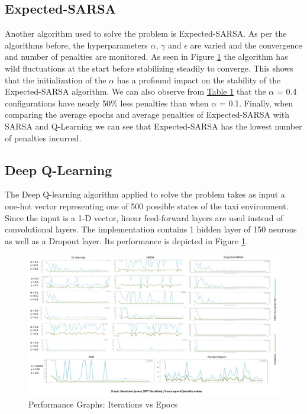 \documentclass{svproc}
\begin{document}
\subsection{Expected-SARSA}
Another algorithm used to solve the problem is Expected-SARSA. As per the algorithms before, the hyperparameters $\alpha$, $\gamma$ and $\epsilon$ are varied and the convergence and number of penalties are monitored. As seen in Figure \ref{fig:comparativeplot} the algorithm has wild fluctuations at the start before stabilizing steadily to converge. This shows that the initialization of the $\alpha$ has a profound impact on the stability of the Expected-SARSA algorithm. We can also observe from \hyperref[tab:table]{Table 1} that the $\alpha$ = 0.4 configurations have nearly 50\% less penalties than when $\alpha$ = 0.1. Finally, when comparing the average epochs and average penalties of Expected-SARSA with SARSA and Q-Learning we can see that Expected-SARSA has the lowest number of penalties incurred. 

\subsection{Deep Q-Learning}
The Deep Q-learning algorithm applied to solve the problem takes as input a one-hot vector representing one of 500 possible states of the taxi environment. Since the input is a 1-D vector, linear feed-forward layers are used instead of convolutional layers. The implementation contains 1 hidden layer of 150 neurons as well as a Dropout layer. Its performance is depicted in Figure \ref{fig:comparativeplot}.
\begin{figure}[]
\centering
\includegraphics[scale = 0.4]{figures/comparativeplotFinal.jpg}
\caption{Performance Graphs: Iterations vs Epocs }
\label{fig:comparativeplot}
\end{figure}
\end{document}
